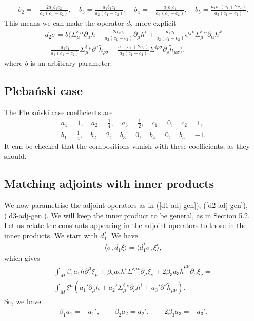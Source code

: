 \documentclass[10pt]{report}
\newcommand{\pleb}[0]{Pleba\'nski}
\theoremstyle{definition}
\begin{document}
\begin{align}
 b_2 = - \frac{2 a_1 b_1 c_2 }{a_2(c_1-c_2)}, \quad b_3 = \frac{ a_1 b_1 c_1 }{a_2(c_1-c_2)}, \quad b_4 = - \frac{a_1 b_1 c_1}{a_3(c_1-c_2)}, \quad b_5 = \frac{a_1 b_1 (c_1+2c_2)}{a_3 (c_1-c_2)}.
\end{align}
This means we can make the operator $d_2$ more explicit
\begin{align}\nonumber
d_2 \sigma = b (  \Sigma^i_\mu{}^\alpha \partial_\alpha h    - \frac{2 a_1 c_2 }{a_2(c_1-c_2)} \partial_\mu h^i +  \frac{ a_1 c_1 }{a_2(c_1-c_2)} \epsilon^{ijk} \Sigma^i_\mu{}^\alpha \partial_\alpha h^k \\ \nonumber
- \frac{a_1 c_1}{a_3(c_1-c_2)} \Sigma^i_\mu{}^\rho \partial^\sigma \tilde{h}_{\rho\sigma} + \frac{a_1 (c_1+2c_2)}{a_3 (c_1-c_2)} \Sigma^{i\rho\sigma}  \partial_\rho \tilde{h}_{\mu\sigma}),
\end{align}
where $b$ is an arbitrary parameter.

\subsection{\pleb{} case}

The \pleb{} case coefficients are
\begin{align}\label{Pleb-coeffs}
a_1=1, \quad a_2 = \frac{1}{4}, \quad a_3=\frac{1}{2}, \quad c_1=0, \quad c_2=1, \\ \nonumber
b_1=\frac{1}{4}, \quad b_2=2, \quad b_3=0, \quad b_4=0, \quad b_5=-1.
\end{align}
It can be checked that the compositions vanish with these coefficients, as they should. 

\subsection{Matching adjoints with inner products}

We now parametrise the adjoint operators as in (\ref{d1-adj-gen}), (\ref{d2-adj-gen}), (\ref{d3-adj-gen}). We will keep the inner product to be general, as in Section 5.2.
Let us relate the constants appearing in the adjoint operators to those in the inner products. We start with $d_1^*$. We have
\begin{align}
\langle \sigma, d_1 \xi\rangle = \langle d_1^* \sigma, \xi\rangle,
\end{align}
which gives
\begin{align}
\int_M \beta_1 a_1 h \partial^\mu \xi_\mu + \beta_2 a_2 h^i \Sigma^{i\mu\nu} \partial_\mu \xi_\nu + 2\beta_3 a_3 \tilde{h}^{\mu\nu} \partial_\mu \xi_\nu =\\ \nonumber
\int_M  \xi^\mu (a_1' \partial_\mu h + a_2' \Sigma^i_\mu{}^\nu \partial_\nu h^i + a_3' \partial^\nu \tilde{h}_{\mu\nu}).
\end{align}
So, we have
\begin{align}\label{a-prime}
\beta_1 a_1 = -  a_1', \qquad \beta_2 a_2 =  a_2', \qquad 2\beta_3 a_3 = -  a_3'.
\end{align}
\end{document}
